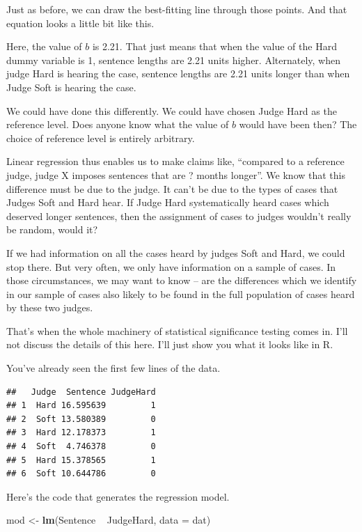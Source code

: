 \documentclass[12pt,twoside]{article}
\newenvironment{Shaded}{}{}
\newcommand{\KeywordTok}[1]{\textcolor[rgb]{0.00,0.44,0.13}{\textbf{{#1}}}}
\newcommand{\DataTypeTok}[1]{\textcolor[rgb]{0.56,0.13,0.00}{{#1}}}
\newcommand{\StringTok}[1]{\textcolor[rgb]{0.25,0.44,0.63}{{#1}}}
\newcommand{\NormalTok}[1]{{#1}}
\begin{document}
Just as before, we can draw the best-fitting line through those points.
And that equation looks a little bit like this.

Here, the value of \(b\) is 2.21. That just means that when the value of
the Hard dummy variable is 1, sentence lengths are 2.21 units higher.
Alternately, when judge Hard is hearing the case, sentence lengths are
2.21 units longer than when Judge Soft is hearing the case.

We could have done this differently. We could have chosen Judge Hard as
the reference level. Does anyone know what the value of \(b\) would have
been then? The choice of reference level is entirely arbitrary.

Linear regression thus enables us to make claims like, ``compared to a
reference judge, judge X imposes sentences that are ? months longer''.
We know that this difference must be due to the judge. It can't be due
to the types of cases that Judges Soft and Hard hear. If Judge Hard
systematically heard cases which deserved longer sentences, then the
assignment of cases to judges wouldn't really be random, would it?

If we had information on all the cases heard by judges Soft and Hard, we
could stop there. But very often, we only have information on a sample
of cases. In those circumstances, we may want to know -- are the
differences which we identify in our sample of cases also likely to be
found in the full population of cases heard by these two judges.

That's when the whole machinery of statistical significance testing
comes in. I'll not discuss the details of this here. I'll just show you
what it looks like in R.

You've already seen the first few lines of the data.

\begin{verbatim}
##   Judge  Sentence JudgeHard
## 1  Hard 16.595639         1
## 2  Soft 13.580389         0
## 3  Hard 12.178373         1
## 4  Soft  4.746378         0
## 5  Hard 15.378565         1
## 6  Soft 10.644786         0
\end{verbatim}

Here's the code that generates the regression model.

\begin{Shaded}
\begin{Highlighting}[]
\NormalTok{mod <-}\StringTok{ }\KeywordTok{lm}\NormalTok{(Sentence ~}\StringTok{ }\NormalTok{JudgeHard, }\DataTypeTok{data =} \NormalTok{dat)}
\end{Highlighting}
\end{Shaded}
\end{document}
